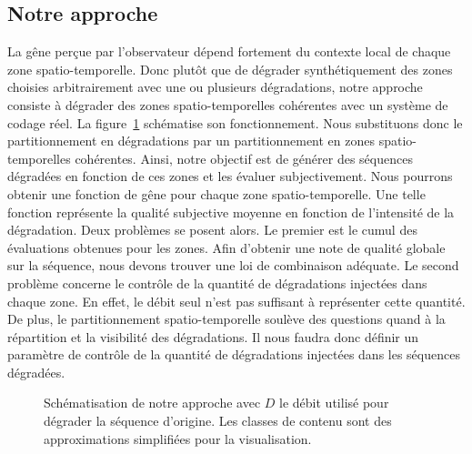 \subsection{Notre approche}
La gêne perçue par l'observateur dépend fortement du contexte local de chaque zone spatio-temporelle. Donc plutôt que de dégrader synthétiquement des zones choisies arbitrairement avec une ou plusieurs dégradations, notre approche consiste à dégrader des zones spatio-temporelles cohérentes avec un système de codage réel. La figure~\ref{fig:monApproche} schématise son fonctionnement. Nous substituons donc le partitionnement en dégradations par un partitionnement en zones spatio-temporelles cohérentes. Ainsi, notre objectif est de générer des séquences dégradées en fonction de ces zones et les évaluer subjectivement. Nous pourrons obtenir une fonction de gêne pour chaque zone spatio-temporelle. Une telle fonction représente la qualité subjective moyenne en fonction de l'intensité de la dégradation. Deux problèmes se posent alors. Le premier est le cumul des évaluations obtenues pour les zones. Afin d'obtenir une note de qualité globale sur la séquence, nous devons trouver une loi de combinaison adéquate. Le second problème concerne le contrôle de la quantité de dégradations injectées dans chaque zone. En effet, le débit seul n'est pas suffisant à représenter cette quantité. De plus, le partitionnement spatio-temporelle soulève des questions quand à la répartition et la visibilité des dégradations. Il nous faudra donc définir un paramètre de contrôle de la quantité de dégradations injectées dans les séquences dégradées.

\begin{figure}[htbp]
	\centering
	\caption{Schématisation de notre approche avec $D$ le débit utilisé pour dégrader la séquence d'origine. Les classes de contenu sont des approximations simplifiées pour la visualisation.}
	\label{fig:monApproche}
\end{figure}

